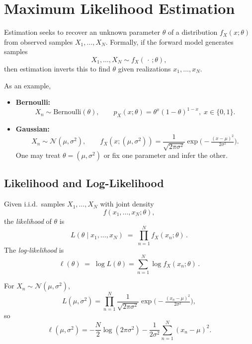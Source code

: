 \section{Maximum Likelihood Estimation}
Estimation seeks to recover an unknown parameter $\theta$ of a distribution $f_X(x;\theta)$ from observed samples $X_1,\dots,X_N$.  Formally, if the forward model generates samples
\begin{equation}
    X_1,\dots,X_N \sim f_X(\,\cdot\,;\theta),
\end{equation}
then estimation inverts this to find $\theta$ given realizations $x_1,\dots,x_N$.

As an example,
\begin{itemize}
    \item \textbf{Bernoulli:}
          \begin{equation}
              X_n \sim \mathrm{Bernoulli}(\theta),\qquad
              p_X(x;\theta)=\theta^x(1-\theta)^{1-x},\;x\in\{0,1\}.
          \end{equation}
    \item \textbf{Gaussian:}
          \begin{equation}
              X_n \sim \mathcal{N}(\mu,\sigma^2),\qquad
              f_X(x;(\mu,\sigma^2))
              =\frac1{\sqrt{2\pi\sigma^2}}
              \exp\!\Big(-\tfrac{(x-\mu)^2}{2\sigma^2}\Big).
          \end{equation}
          One may treat $\theta=(\mu,\sigma^2)$ or fix one parameter and infer the other.
\end{itemize}

\subsection{Likelihood and Log-Likelihood}
Given i.i.d.\ samples $X_1,\dots,X_N$ with joint density
\begin{equation}
    f(x_1,\dots,x_N;\theta),
\end{equation}
the \emph{likelihood} of $\theta$ is
\begin{equation}
    L(\theta\mid x_1,\dots,x_N)
    \;=\;\prod_{n=1}^N f_X(x_n;\theta)\,.
\end{equation}
The \emph{log-likelihood} is
\begin{equation}
    \ell(\theta)
    \;=\;\log L(\theta)
    =\sum_{n=1}^N \log f_X(x_n;\theta)\,.
\end{equation}

For $X_n\sim\mathcal{N}(\mu,\sigma^2)$,
\begin{equation}
    L(\mu,\sigma^2)
    =\prod_{n=1}^N \frac{1}{\sqrt{2\pi\sigma^2}}
    \exp\!\Big(-\tfrac{(x_n-\mu)^2}{2\sigma^2}\Big),
\end{equation}
so
\begin{equation}
    \ell(\mu,\sigma^2) = -\frac{N}{2}\log(2\pi\sigma^2)
    -\frac{1}{2\sigma^2}\sum_{n=1}^N (x_n-\mu)^2.
\end{equation}

